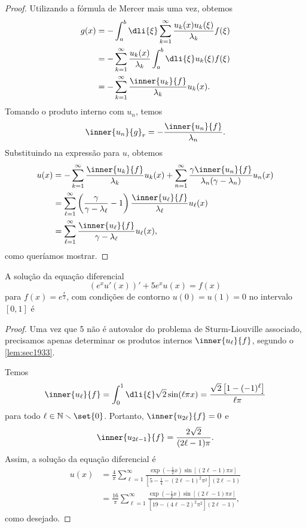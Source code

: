\begin{proof}
    Utilizando a fórmula de Mercer mais uma vez, obtemos
    \begin{align*}
        g(x) &= -\int_a^b \dli{\xi} \sum_{k = 1}^\infty \frac{u_k(x)u_k(\xi)}{\lambda_k} f(\xi)\\
             &= - \sum_{k = 1}^\infty \frac{u_k(x)}{\lambda_k} \int_{a}^{b}\dli{\xi} u_k(\xi) f(\xi)\\
             &= - \sum_{k = 1}^\infty \frac{\inner{u_k}{f}}{\lambda_k}u_k(x).
    \end{align*}
    Tomando o produto interno com \(u_n\), temos
    \begin{equation*}
        \inner{u_n}{g}_r = -\frac{\inner{u_n}{f}}{\lambda_n}.
    \end{equation*}
    Substituindo na expressão para \(u\), obtemos
    \begin{align*}
        u(x) &= - \sum_{k=1}^\infty \frac{\inner{u_k}{f}}{\lambda_k}u_k(x) + \sum_{n=1}^\infty\frac{\gamma\inner{u_n}{f}}{\lambda_n(\gamma - \lambda_n)}u_n(x)\\
             &= \sum_{\ell = 1}^\infty \left(\frac{\gamma}{\gamma - \lambda_\ell} - 1\right)\frac{\inner{u_\ell}{f}}{\lambda_\ell}u_\ell(x)\\
             &= \sum_{\ell = 1}^\infty \frac{\inner{u_\ell}{f}}{\gamma - \lambda_\ell}u_\ell(x),
    \end{align*}
    como queríamos mostrar.
\end{proof}
\begin{corollary}
    A solução da equação diferencial
    \begin{equation*}
        (e^xu'(x))' + 5e^x u(x) = f(x)
    \end{equation*}
    para \(f(x) = e^{\frac{x}{2}}\), com condições de contorno \(u(0) = u(1) = 0\) no intervalo \([0,1]\) é
\end{corollary}
\begin{proof}
    Uma vez que 5 não é autovalor do problema de Sturm-Liouville associado, precisamos apenas determinar os produtos internos \(\inner{u_\ell}{f}\), segundo o \cref{lem:sec1933}.

    Temos
    \begin{equation*}
        \inner{u_\ell}{f} = \int_0^1 \dli{\xi} \sqrt{2} \sin(\ell\pi x) = \frac{\sqrt{2}\left[1 - (-1)^\ell\right]}{\ell \pi}
    \end{equation*}
    para todo \(\ell \in \mathbb{N} \smallsetminus\set{0}\). Portanto, \(\inner{u_{2\ell}}{f} = 0\) e
    \begin{equation*}
        \inner{u_{2\ell-1}}{f} = \frac{2\sqrt{2}}{(2\ell - 1)\pi}.
    \end{equation*}
    Assim, a solução da equação diferencial é
    \begin{align*}
        u(x) &= \frac{4}{\pi} \sum_{\ell = 1}^\infty \frac{\exp\left(-\frac12x\right)\sin\left[(2\ell - 1)\pi x\right]}{[5 - \frac{1}{4} - (2\ell - 1)^2\pi^2](2\ell - 1)}\\
             &= \frac{16}{\pi} \sum_{\ell = 1}^\infty \frac{\exp\left(-\frac12x\right)\sin\left[(2\ell - 1)\pi x\right]}{[19 - (4\ell - 2)^2\pi^2](2\ell - 1)},
    \end{align*}
    como desejado.
\end{proof}

